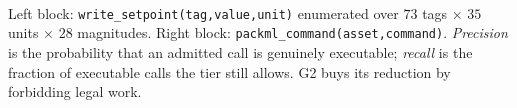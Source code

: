 \begin{table}[t]
\centering
\caption{E5: size and fidelity of the admissible action space.}
\label{tab:e5-actionspace}
\footnotesize
{}
\\[4pt]\begin{minipage}{\linewidth}\footnotesize Left block: \texttt{write\_setpoint(tag,value,unit)} enumerated over $73$ tags $\times$ $35$ units $\times$ $28$ magnitudes. Right block: \texttt{packml\_command(asset,command)}. \emph{Precision} is the probability that an admitted call is genuinely executable; \emph{recall} is the fraction of executable calls the tier still allows. G2 buys its reduction by forbidding legal work.\end{minipage}
\end{table}
